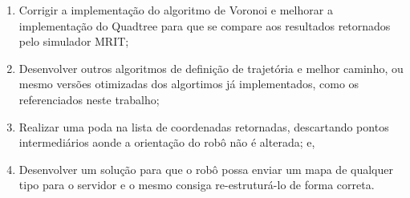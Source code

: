 \begin{enumerate}
	\item Corrigir a implementação do algoritmo de Voronoi e melhorar a implementação do Quadtree para que se compare aos resultados retornados pelo simulador MRIT;
	\item Desenvolver outros algoritmos de definição de trajetória e melhor caminho, ou mesmo versões otimizadas dos algortimos já implementados, como os referenciados neste trabalho;
	\item Realizar uma poda na lista de coordenadas retornadas, descartando pontos intermediários aonde a orientação do robô não é alterada; e,
	\item Desenvolver um solução para que o robô possa enviar um mapa de qualquer tipo para o servidor e o mesmo consiga re-estruturá-lo de forma correta.
\end{enumerate}